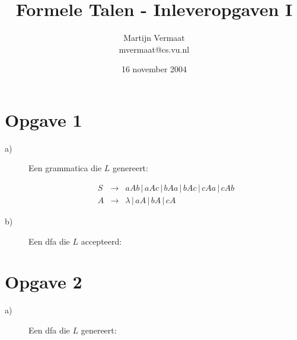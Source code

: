 \documentclass[a4paper,11pt]{article}
\title{Formele Talen - Inleveropgaven I}
\author{
    Martijn Vermaat\\
    mvermaat@cs.vu.nl
}
\date{16 november 2004}
\begin{document}
\maketitle


\section*{Opgave 1}


\begin{description}


\item[a)]

Een grammatica die $L$ genereert:

\begin{eqnarray}
S & \rightarrow & aAb \, | \, aAc \, | \, bAa \, | \, bAc \, | \, cAa \, | \, cAb \nonumber \\
A & \rightarrow & \lambda \, | \, aA \, | \, bA \, | \, cA \nonumber
\end{eqnarray}

\item[b)]

Een dfa die $L$ accepteerd:\\[1em]




\end{description}


\section*{Opgave 2}


\begin{description}


\item[a)]

Een dfa die $L$ genereert:\\[1em]




\end{description}
\end{document}
